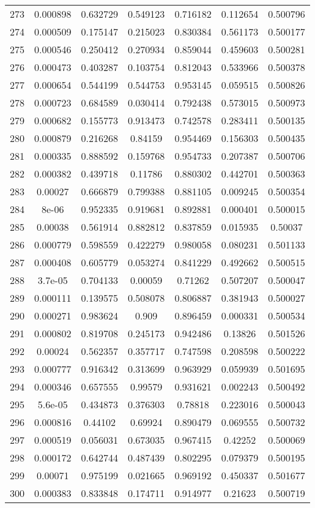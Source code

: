 \begin{table}
\begin{tabular}{c|c|c|c|c|c|c}
273 & 0.000898 & 0.632729 & 0.549123 & 0.716182 & 0.112654 & 0.500796\\
274 & 0.000509 & 0.175147 & 0.215023 & 0.830384 & 0.561173 & 0.500177\\
275 & 0.000546 & 0.250412 & 0.270934 & 0.859044 & 0.459603 & 0.500281\\
276 & 0.000473 & 0.403287 & 0.103754 & 0.812043 & 0.533966 & 0.500378\\
277 & 0.000654 & 0.544199 & 0.544753 & 0.953145 & 0.059515 & 0.500826\\
278 & 0.000723 & 0.684589 & 0.030414 & 0.792438 & 0.573015 & 0.500973\\
279 & 0.000682 & 0.155773 & 0.913473 & 0.742578 & 0.283411 & 0.500135\\
280 & 0.000879 & 0.216268 & 0.84159 & 0.954469 & 0.156303 & 0.500435\\
281 & 0.000335 & 0.888592 & 0.159768 & 0.954733 & 0.207387 & 0.500706\\
282 & 0.000382 & 0.439718 & 0.11786 & 0.880302 & 0.442701 & 0.500363\\
283 & 0.00027 & 0.666879 & 0.799388 & 0.881105 & 0.009245 & 0.500354\\
284 & 8e-06 & 0.952335 & 0.919681 & 0.892881 & 0.000401 & 0.500015\\
285 & 0.00038 & 0.561914 & 0.882812 & 0.837859 & 0.015935 & 0.50037\\
286 & 0.000779 & 0.598559 & 0.422279 & 0.980058 & 0.080231 & 0.501133\\
287 & 0.000408 & 0.605779 & 0.053274 & 0.841229 & 0.492662 & 0.500515\\
288 & 3.7e-05 & 0.704133 & 0.00059 & 0.71262 & 0.507207 & 0.500047\\
289 & 0.000111 & 0.139575 & 0.508078 & 0.806887 & 0.381943 & 0.500027\\
290 & 0.000271 & 0.983624 & 0.909 & 0.896459 & 0.000331 & 0.500534\\
291 & 0.000802 & 0.819708 & 0.245173 & 0.942486 & 0.13826 & 0.501526\\
292 & 0.00024 & 0.562357 & 0.357717 & 0.747598 & 0.208598 & 0.500222\\
293 & 0.000777 & 0.916342 & 0.313699 & 0.963929 & 0.059939 & 0.501695\\
294 & 0.000346 & 0.657555 & 0.99579 & 0.931621 & 0.002243 & 0.500492\\
295 & 5.6e-05 & 0.434873 & 0.376303 & 0.78818 & 0.223016 & 0.500043\\
296 & 0.000816 & 0.44102 & 0.69924 & 0.890479 & 0.069555 & 0.500732\\
297 & 0.000519 & 0.056031 & 0.673035 & 0.967415 & 0.42252 & 0.500069\\
298 & 0.000172 & 0.642744 & 0.487439 & 0.802295 & 0.079379 & 0.500195\\
299 & 0.00071 & 0.975199 & 0.021665 & 0.969192 & 0.450337 & 0.501677\\
300 & 0.000383 & 0.833848 & 0.174711 & 0.914977 & 0.21623 & 0.500719\\
\end{tabular}
\end{table}
